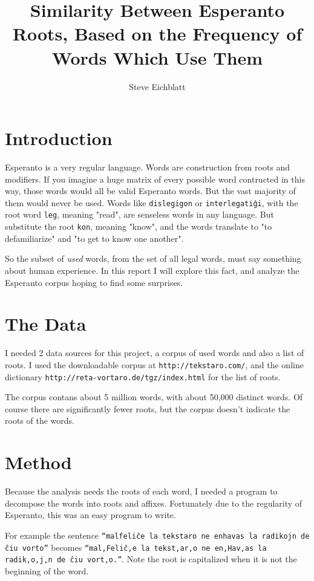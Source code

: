 \documentclass[12pt,twoside]{article}
\title{Similarity Between Esperanto Roots, Based on the Frequency of Words Which Use Them}
\author{Steve Eichblatt}
\begin{document}
\maketitle

\thispagestyle{fancy}
\section{Introduction}

Esperanto is a very regular language. Words are construction from roots and modifiers. If you imagine a huge matrix of every possible word contructed in this way, those words would all be valid Esperanto words. But the vast majority of them would never be used. Words like \texttt{dislegigon} or \texttt{interlegatiĝi}, with the root word \texttt{leg}, meaning "read",
are senseless words in any language. But substitute the root \texttt{kon}, meaning "know", and the words translate to
"to defamiliarize" and "to get to know one another". 

So the subset of {\it used} words, from the set of all legal words, must say something about human experience. In this report
I will explore this fact, and analyze the Esperanto corpus hoping to find some surprises.

\section{The Data}

I needed 2 data sources for this project, a corpus of used words and also a list of roots. 
I used the downloadable corpus at \texttt{http://tekstaro.com/}, and the online dictionary \texttt{http://reta-vortaro.de/tgz/index.html} for the list of roots. 

The corpus contans about 5 million words, with about 50,000 distinct words. Of course there are significantly fewer roots,
but the corpus doesn't indicate the roots of the words.

\section{Method}

Because the analysis needs the roots of each word, I needed a program to decompose the words into roots and affixes. 
Fortunately due to the regularity of Esperanto, this was an easy program to write.

For example the sentence \texttt{``malfeliĉe la tekstaro ne enhavas la radikojn de ĉiu vorto''} becomes
\texttt{``mal,Feliĉ,e la tekst,ar,o ne en,Hav,as la radik,o,j,n de ĉiu vort,o.''}. Note the root is capitalized 
when it is not the beginning of the word.
\end{document}
